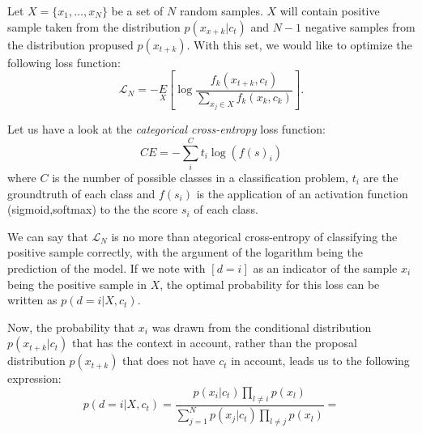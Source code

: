 Let $X = \{x_1,\dots,x_N\}$ be a set of $N$ random samples. $X$ will contain positive sample taken from the distribution $p(x_{x+k}|c_t)$ and $N-1$ negative
samples from the distribution propused $p(x_{t+k})$. With this set, we would like to optimize the following loss function:
$$
\mathcal L_N = - \underset{X}{E} \left[\log \frac{f_k(x_{t+k},c_t)}{\sum_{x_j \in X} f_k(x_k,c_k)}\right].
$$

Let us have a look at the \emph{categorical cross-entropy} loss function:
\[
    CE = -\sum_i^C t_i \log(f(s)_i)    
\]
where $C$ is the number of possible classes in a classification problem, $t_i$ are the groundtruth of each class and $f(s_i)$ is the application of an activation function (sigmoid,softmax) to the the score $s_i$ of each class.

We can say that $\mathcal L_N$ is no more than ategorical cross-entropy of classifying the positive sample correctly, with the argument of the logarithm being the prediction
of the model. If we note with $[d = i]$ as an indicator of the sample $x_i$ being the positive sample in $X$, the optimal probability for this loss can be written as $p(d = i|X,c_t)$. 

Now, the probability that $x_i$ was drawn from the conditional distribution $p(x_{t+k}|c_t)$ that has the context in account, rather than the proposal distribution $p(x_{t+k})$ that does not have $c_t$ in account, leads us to the following expression:
$$
p(d = i | X , c_t) = \frac{p(x_i|c_t) \prod_{l \neq i}p(x_l)}{\sum_{j=1}^N p(x_j|c_t) \prod_{l \neq j} p(x_l)} = 
$$